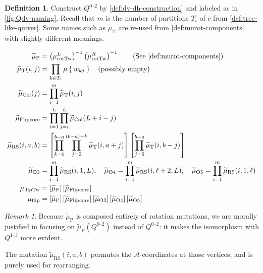 \documentclass{amsart}
\theoremstyle{plain}
\theoremstyle{definition}
\newtheorem{definition}[theorem]{Definition}
\theoremstyle{remark}
\newtheorem{remark}[theorem]{Remark}
\newcommand{\Qdv}{Q^{0\text{--}2}}
\newcommand{\Qdh}{Q^{1\text{--}3}}
\newcommand{\muflip}{{\mu_{\text{flip}}}}
\newcommand{\mufliptwist}{{\mu_{\text{flipTw}}}}
\newcommand{\murottwistL}{{\mu^{L}_{\text{rotTw}}}}
\newcommand{\murottwistR}{{\mu^{R}_{\text{rotTw}}}}
\newcommand{\muint}[1]{\widetilde{\mu}_{\text{#1}}}
\newcommand{\muflipcore}{\muint{Flipcore}}
\newcommand{\murowperm}{\muint{RS}}
\newcommand{\mucol}{\muint{Col}}
\newcommand{\muT}{\muint{T}}
\newcommand{\muP}{\muint{P}}
\begin{document}
  \begin{definition}
    \label{def:muflip-components}
    Construct $\Qdv$ by \cref{def:dv-dh-construction} and labeled as in
    \cref{fig:Qdv-naming}. Recall that $m$ is the number of partitions
    $T_i$ of $c$ from \cref{def:tree-like-quiver}. Some names such as
    $\muT$ are re-used from \cref{def:murot-components} with slightly
    different meanings.

    \begingroup \allowdisplaybreaks
    \begin{align*}
      \muP &= \left( \murottwistL \right)^{-1} \left( \murottwistR \right)^{-1} \tag{See \cref{def:murot-components}} \\
      \muT(i,j) &= \prod_{k \in T_i} \mu\Set{w_{kj}} \quad \text{(possibly empty)} \\
      \mucol(j) &= \prod_{i = 1}^{m} \muT(i,j) \\
      \muflipcore &= \prod_{i=1}^{L} \prod_{j=i}^{L} \mucol(L + i - j) \\
      \murowperm(i, a, b) &= \left[ \prod_{k=0}^{b-a} \prod_{j=0}^{(b-a) - k} \muT(i, a + j) \right] \left[ \prod_{j=0}^{b-a} \muT(i, b - j) \right] \\
      \muint{O3} &= \prod_{i=1}^{m} \murowperm(i, 1, L), \quad \muint{O4} = \prod_{i=1}^{m} \murowperm(i, \ell + 2, L), \quad \muint{O5} = \prod_{i=1}^{m} \murowperm(i, 1, \ell) \\
      \mufliptwist &= \left[ \muP \right] \left[ \muflipcore \right] \\
      \muflip &= \left[ \muP \right] \left[ \muflipcore \right] \left[ \muint{O3} \right] \left[ \muint{O4} \right] \left[ \muint{O5} \right]
    \end{align*}
    \endgroup
  \end{definition}

  \begin{remark}
    Because $\muP$ is composed entirely of rotation mutations, we are
    morally justified in focusing on $\muP(\Qdv)$ instead of $\Qdv$: it
    makes the isomorphism with $\Qdh$ more evident.

    The mutation $\murowperm(i, a, b)$ permutes the
    $\mathcal{A}$-coordinates at those vertices, and is purely used for
    rearranging.
  \end{remark}
\end{document}
